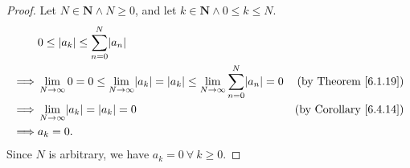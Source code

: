\begin{proof}
    Let \(N \in \mathbf{N} \land N \geq 0\), and let \(k \in \mathbf{N} \land 0 \leq k \leq N\).
    \begin{align*}
                 & 0 \leq \abs*{a_k} \leq \sum_{n = 0}^N \abs*{a_n}                                                                                                                       \\
        \implies & \lim_{N \to \infty} 0 = 0 \leq \lim_{N \to \infty} \abs*{a_k} = \abs*{a_k} \leq \lim_{N \to \infty} \sum_{n = 0}^N \abs*{a_n} = 0 & \text{(by Theorem \ref{6.1.19})}   \\
        \implies & \lim_{N \to \infty} \abs*{a_k} = \abs*{a_k} = 0                                                                                   & \text{(by Corollary \ref{6.4.14})} \\
        \implies & a_k = 0.
    \end{align*}
    Since \(N\) is arbitrary, we have \(a_k = 0 \ \forall\ k \geq 0\).
\end{proof}